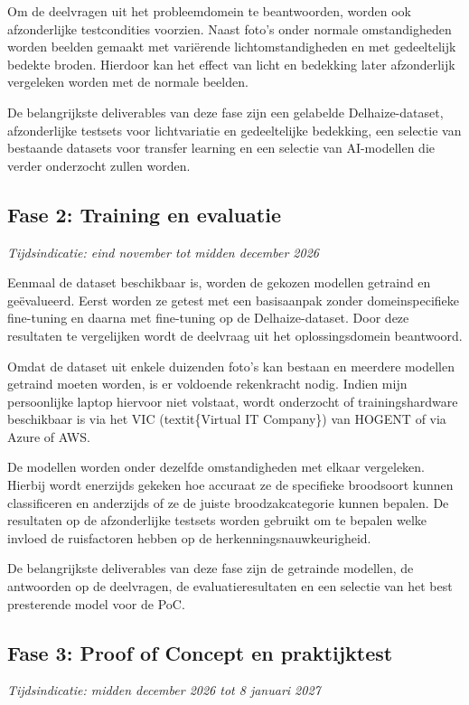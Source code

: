 Om de deelvragen uit het probleemdomein te beantwoorden, worden ook afzonderlijke testcondities voorzien. Naast foto's onder normale omstandigheden worden beelden gemaakt met variërende lichtomstandigheden en met gedeeltelijk bedekte broden. Hierdoor kan het effect van licht en bedekking later afzonderlijk vergeleken worden met de normale beelden.

De belangrijkste deliverables van deze fase zijn een gelabelde Delhaize-dataset, afzonderlijke testsets voor lichtvariatie en gedeeltelijke bedekking, een selectie van bestaande datasets voor transfer learning en een selectie van AI-modellen die verder onderzocht zullen worden.

\subsection{Fase 2: Training en evaluatie}
\emph{Tijdsindicatie: eind november tot midden december 2026}

Eenmaal de dataset beschikbaar is, worden de gekozen modellen getraind en geëvalueerd. Eerst worden ze getest met een basisaanpak zonder domeinspecifieke fine-tuning en daarna met fine-tuning op de Delhaize-dataset. Door deze resultaten te vergelijken wordt de deelvraag uit het oplossingsdomein beantwoord.

Omdat de dataset uit enkele duizenden foto's kan bestaan en meerdere modellen getraind moeten worden, is er voldoende rekenkracht nodig. Indien mijn persoonlijke laptop hiervoor niet volstaat, wordt onderzocht of trainingshardware beschikbaar is via het VIC (textit\{Virtual IT Company\}) van HOGENT of via Azure of AWS.

De modellen worden onder dezelfde omstandigheden met elkaar vergeleken. Hierbij wordt enerzijds gekeken hoe accuraat ze de specifieke broodsoort kunnen classificeren en anderzijds of ze de juiste broodzakcategorie kunnen bepalen. De resultaten op de afzonderlijke testsets worden gebruikt om te bepalen welke invloed de ruisfactoren hebben op de herkenningsnauwkeurigheid.

De belangrijkste deliverables van deze fase zijn de getrainde modellen, de antwoorden op de deelvragen, de evaluatieresultaten en een selectie van het best presterende model voor de PoC.

\subsection{Fase 3: Proof of Concept en praktijktest}
\emph{Tijdsindicatie: midden december 2026 tot 8 januari 2027}

